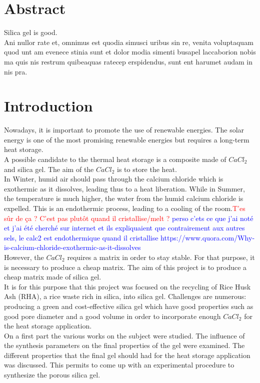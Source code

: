 \documentclass[12pt,a4paper]{article}
\begin{document}
\section*{Abstract}
Silica gel is good.\\
Ani nullor rate et, omnimus est quodia simusci uribus sin re, venita voluptaquam
quod unt am evenece stinia sunt et dolor modia simenti busapel laccaborion
nobis ma quis nis restrum quibeaquas ratecep erspidendus, sunt ent harumet
audam in nis pra.
\section{Introduction}
Nowadays, it is important to promote the use of renewable energies. The solar energy is one of the most promising renewable energies but requires a long-term heat storage. %
\\A possible candidate to the thermal heat storage is a composite made of $CaCl_2$ and silica gel. The aim of the $CaCl_2$ is to store the heat.
\\In Winter, humid air should pass through the calcium chloride which is exothermic as it dissolves, leading thus to a heat liberation. While in Summer, the temperature is much higher, the water from the humid calcium chloride is expelled. This is an endothermic process, leading to a cooling of the room.\textcolor{red}{T'es sûr de ça ? C'est pas plutôt quand il cristallise/melt ?} \textcolor{blue}{perso c'ets ce que j'ai noté et j'ai été cherché sur internet et ils expliquaient que contrairement aux autres sels, le calc2 est endothermique quand il cristallise https://www.quora.com/Why-is-calcium-chloride-exothermic-as-it-dissolves}
\\However, the $CaCl_2$ requires a matrix in order to stay stable. For that purpose, it is necessary to produce a cheap matrix. The aim of this project is to produce a cheap matrix made of silica gel. 
\\It is for this purpose that this project was focused on the recycling of Rice Husk Ash (RHA), a rice waste rich in silica, into silica gel. 
Challenges are numerous: producing a green and cost-effective silica gel which have good properties such as good pore diameter and a good volume in order to incorporate enough $CaCl_2$ for the heat storage application.
\\On a first part the various works on the subject were studied. The influence of the synthesis parameters on the final properties of the gel were examined. The different properties that the final gel should had for the heat storage application was discussed. This permits to come up with an experimental procedure to synthesize the porous silica gel.
\clearpage
\end{document}
